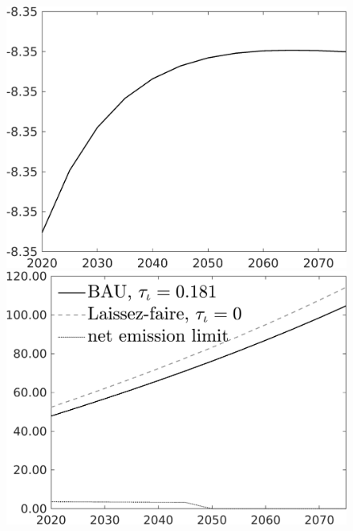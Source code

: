 \documentclass[12pt]{article}
\begin{document}
\begin{figure}[h!!]
	\begin{minipage}[]{0.32\textwidth}
		\includegraphics[width=1\textwidth]{../../codding_model/own_basedOnFried/optimalPol_010922_revision/figures/all_13Sept22/CompTaul_Equlab_LFBAUPer_Reg0_C_spillover0_nsk0_xgr0_knspil1_sep1_countec0_GovRev0_etaa0.79.png}
	\end{minipage}	
	\begin{minipage}[]{0.32\textwidth}
		\includegraphics[width=1\textwidth]{../../codding_model/own_basedOnFried/optimalPol_010922_revision/figures/all_13Sept22/CompTaul_Equlab_LFBAU_Reg0_Emnet_spillover0_nsk0_xgr0_knspil1_sep1_countec0_GovRev0_etaa0.79_lgd1.png}

\end{minipage}
\end{figure}
\end{document}
